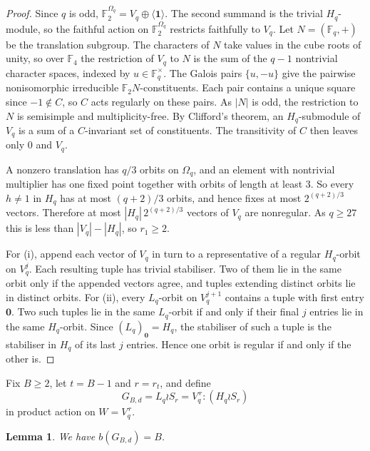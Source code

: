 \documentclass[a4paper,reqno,11pt]{amsart}
\newcommand\F{\mathbb{F}}
\newtheorem{lem}[thm]{Lemma}
\numberwithin{equation}{section}
\begin{document}
\begin{proof}
Since $q$ is odd, $\F_2^{\Omega_q}=V_q\oplus\langle\mathbf1\rangle$. The second summand is the trivial $H_q$-module, so the faithful action on $\F_2^{\Omega_q}$ restricts faithfully to $V_q$. Let $N=(\F_q,+)$ be the translation subgroup. The characters of $N$ take values in the cube roots of unity, so over $\F_4$ the restriction of $V_q$ to $N$ is the sum of the $q-1$ nontrivial character spaces, indexed by $u\in\F_q^\times$. The Galois pairs $\{u,-u\}$ give the pairwise nonisomorphic irreducible $\F_2N$-constituents. Each pair contains a unique square since $-1\notin C$, so $C$ acts regularly on these pairs. As $|N|$ is odd, the restriction to $N$ is semisimple and multiplicity-free. By Clifford's theorem, an $H_q$-submodule of $V_q$ is a sum of a $C$-invariant set of constituents. The transitivity of $C$ then leaves only $0$ and $V_q$.

A nonzero translation has $q/3$ orbits on $\Omega_q$, and an element with nontrivial multiplier has one fixed point together with orbits of length at least $3$. So every $h\ne1$ in $H_q$ has at most $(q+2)/3$ orbits, and hence fixes at most $2^{(q+2)/3}$ vectors. Therefore at most $|H_q|\,2^{(q+2)/3}$ vectors of $V_q$ are nonregular. As $q\ge27$ this is less than $|V_q|-|H_q|$, so $r_1\ge2$.

For (i), append each vector of $V_q$ in turn to a representative of a regular $H_q$-orbit on $V_q^j$. Each resulting tuple has trivial stabiliser. Two of them lie in the same orbit only if the appended vectors agree, and tuples extending distinct orbits lie in distinct orbits. For (ii), every $L_q$-orbit on $V_q^{j+1}$ contains a tuple with first entry $\mathbf0$. Two such tuples lie in the same $L_q$-orbit if and only if their final $j$ entries lie in the same $H_q$-orbit. Since $(L_q)_{\mathbf0}=H_q$, the stabiliser of such a tuple is the stabiliser in $H_q$ of its last $j$ entries. Hence one orbit is regular if and only if the other is.
\end{proof}

Fix $B\ge2$, let $t=B-1$ and $r=r_t$, and define
\begin{equation}\label{eq:genconstruction}
G_{B,d}=L_q\wr S_r
       =V_q^{\,r}{:}(H_q\wr S_r)
\end{equation}
in product action on $W=V_q^{\,r}$.

\begin{lem}\label{genbase}
We have $b(G_{B,d})=B$.
\end{lem}
\end{document}
